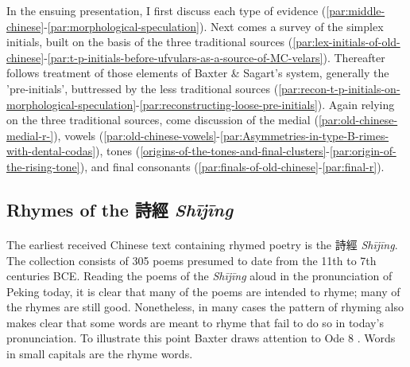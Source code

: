 In the ensuing presentation, I first discuss each type of evidence
(\ref{par:middle-chinese}-\ref{par:morphological-speculation}). Next comes a survey of the simplex initials, built on the basis
of the three traditional sources (\ref{par:lex-initials-of-old-chinese}-\ref{par:t-p-initials-before-ufvulars-as-a-source-of-MC-velars}). Thereafter follows treatment of
those elements of Baxter \& Sagart's system, generally the
'pre-initials', buttressed by the less traditional sources (\ref{par:recon-t-p-initials-on-morphological-speculation}-\ref{par:reconstructing-loose-pre-initials}). Again
relying on the three traditional sources, come discussion of the medial
(\ref{par:old-chinese-medial-r-}), vowels (\ref{par:old-chinese-vowels}-\ref{par:Asymmetries-in-type-B-rimes-with-dental-codas}), tones (\ref{origins-of-the-tones-and-final-clusters}-\ref{par:origin-of-the-rising-tone}), and final consonants (\ref{par:finals-of-old-chinese}-\ref{par:final-r}).


\subsection{\texorpdfstring{Rhymes of the 詩經
 \emph{Shījīng}}{Rhymes of the 詩經 Shījīng}}
 

\paragraph{}
\label{par:rhymes-of-the-Shijing}
The earliest received Chinese text containing rhymed poetry is the
詩經  \emph{Shījīng}. The collection consists of 305 poems presumed to
date from the 11th to 7th centuries BCE. Reading the poems of the
 \emph{Shījīng} aloud in the pronunciation of Peking today, it is
clear that many of the poems are intended to rhyme; many of the rhymes
are still good. Nonetheless, in many cases the pattern of rhyming also
makes clear that some words are meant to rhyme that fail to do so in
today's pronunciation. To illustrate this point Baxter draws attention
to Ode 8 
\citeyearpar[151]{Baxter1992}. Words in small capitals are the rhyme words.

